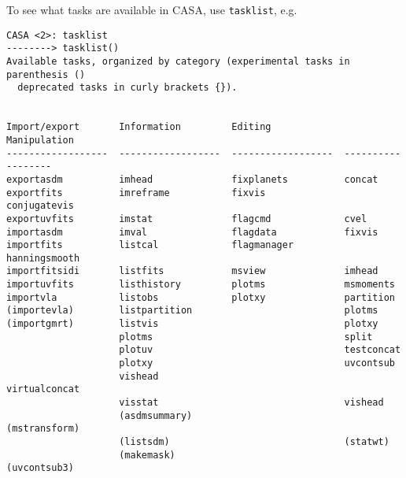 To see what tasks are available in CASA, use {\tt tasklist}, e.g.
\small
\begin{verbatim}
CASA <2>: tasklist
--------> tasklist()
Available tasks, organized by category (experimental tasks in parenthesis ()
  deprecated tasks in curly brackets {}).


Import/export       Information         Editing             Manipulation      
------------------  ------------------  ------------------  ------------------
exportasdm          imhead              fixplanets          concat            
exportfits          imreframe           fixvis              conjugatevis      
exportuvfits        imstat              flagcmd             cvel              
importasdm          imval               flagdata            fixvis            
importfits          listcal             flagmanager         hanningsmooth     
importfitsidi       listfits            msview              imhead            
importuvfits        listhistory         plotms              msmoments         
importvla           listobs             plotxy              partition         
(importevla)        listpartition                           plotms            
(importgmrt)        listvis                                 plotxy            
                    plotms                                  split             
                    plotuv                                  testconcat        
                    plotxy                                  uvcontsub         
                    vishead                                 virtualconcat     
                    visstat                                 vishead           
                    (asdmsummary)                           (mstransform)     
                    (listsdm)                               (statwt)          
                    (makemask)                              (uvcontsub3)      


\end{verbatim}
